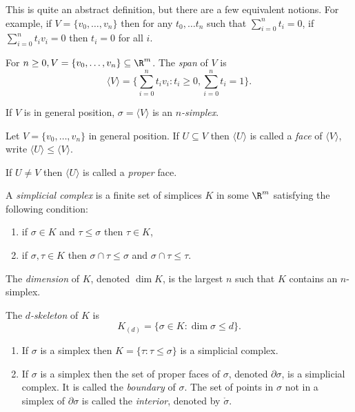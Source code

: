 \documentclass[a4paper]{article}
\renewcommand{\b}{\partial} %
\newcommand{\interior}{\mathring} %
\begin{document}
This is quite an abstract definition, but there are a few equivalent notions. For example, if \(V = \{v_0, \dots, v_n\}\) then for any \(t_0, \dots t_n\) such that \(\sum_{i = 0}^n t_i = 0\), if \(\sum_{i = 0}^n t_iv_i = 0\) then \(t_i = 0\) for all \(i\).

\begin{definition}[simplex]
  For \(n \geq 0, V = \{v_0, \dots, v_n\} \subseteq \R^m\). The \emph{span} of \(V\) is
  \[
    \langle V \rangle = \{\sum_{i = 0}^n t_iv_i: t_i \geq 0, \sum_{i = 0}^n t_i = 1\}.
  \]

  If \(V\) is in general position, \(\sigma = \langle V \rangle\) is an \emph{\(n\)-simplex}.
\end{definition}

\begin{definition}[face]
  Let \(V = \{v_0, \dots, v_n\}\) in general position. If \(U \subseteq V\) then \(\langle U \rangle\) is called a \emph{face} of \(\langle V\rangle\), write \(\langle U \rangle \leq \langle V \rangle\).

  If \(U \neq V\) then \(\langle U\rangle\) is called a \emph{proper} face.
\end{definition}

\begin{definition}
  A \emph{simplicial complex} is a finite set of simplices \(K\) in some \(\R^m\) satisfying the following condition:
  \begin{enumerate}
  \item if \(\sigma \in K\) and \(\tau \leq \sigma\) then \(\tau \in K\),
  \item if \(\sigma, \tau \in K\) then \(\sigma \cap \tau \leq \sigma\) and \(\sigma \cap \tau \leq \tau\).
  \end{enumerate}

  The \emph{dimension} of \(K\), denoted \(\dim K\), is the largest \(n\) such that \(K\) contains an \(n\)-simplex.

  The \emph{\(d\)-skeleton} of \(K\) is
  \[
    K_{(d)} = \{\sigma \in K: \dim \sigma \leq d\}.
  \]
\end{definition}

\begin{eg}\leavevmode
  \begin{enumerate}
  \item If \(\sigma\) is a simplex then \(K = \{\tau: \tau \leq \sigma\}\) is a simplicial complex.
  \item If \(\sigma\) is a simplex then the set of proper faces of \(\sigma\), denoted \(\b \sigma\), is a simplicial complex. It is called the \emph{boundary} of \(\sigma\). The set of points in \(\sigma\) not in a simplex of \(\b \sigma\) is called the \emph{interior}, denoted by \(\interior \sigma\).
  \end{enumerate}
\end{eg}
\end{document}
